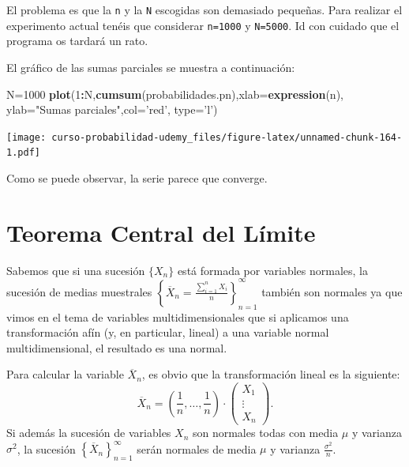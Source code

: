 \documentclass[]{book}
\newenvironment{Shaded}{\begin{snugshade}}{\end{snugshade}}
\newcommand{\DataTypeTok}[1]{\textcolor[rgb]{0.13,0.29,0.53}{#1}}
\newcommand{\DecValTok}[1]{\textcolor[rgb]{0.00,0.00,0.81}{#1}}
\newcommand{\KeywordTok}[1]{\textcolor[rgb]{0.13,0.29,0.53}{\textbf{#1}}}
\newcommand{\NormalTok}[1]{#1}
\newcommand{\OperatorTok}[1]{\textcolor[rgb]{0.81,0.36,0.00}{\textbf{#1}}}
\newcommand{\StringTok}[1]{\textcolor[rgb]{0.31,0.60,0.02}{#1}}
\begin{document}
El problema es que la \texttt{n} y la \texttt{N} escogidas son demasiado pequeñas. Para realizar el experimento actual tenéis que considerar \texttt{n=1000} y \texttt{N=5000}. Id con cuidado que el programa os tardará un rato.

El gráfico de las sumas parciales se muestra a continuación:

\begin{Shaded}
\begin{Highlighting}[]
\NormalTok{N=}\DecValTok{1000}
\KeywordTok{plot}\NormalTok{(}\DecValTok{1}\OperatorTok{:}\NormalTok{N,}\KeywordTok{cumsum}\NormalTok{(probabilidades.pn),}\DataTypeTok{xlab=}\KeywordTok{expression}\NormalTok{(n),}
     \DataTypeTok{ylab=}\StringTok{"Sumas parciales"}\NormalTok{,}\DataTypeTok{col=}\StringTok{'red'}\NormalTok{, }\DataTypeTok{type=}\StringTok{'l'}\NormalTok{)}
\end{Highlighting}
\end{Shaded}

\texttt{[image: curso-probabilidad-udemy\_files/figure-latex/unnamed-chunk-164-1.pdf]}

Como se puede observar, la serie parece que converge.

\hypertarget{teorema-central-del-luxedmite}{%
\section{Teorema Central del Límite}\label{teorema-central-del-luxedmite}}

Sabemos que si una sucesión \(\{X_n\}\) está formada por variables normales, la sucesión de medias muestrales \(\left\{\overline{X}_n=\frac{\sum\limits_{i=1}^n X_i}{n}\right\}_{n=1}^\infty\) también son normales ya que vimos en el tema de variables multidimensionales que si aplicamos una transformación afín (y, en particular, lineal) a una variable normal multidimensional, el resultado es una normal.

Para calcular la variable \(\overline{X}_n\), es obvio que la transformación lineal es la siguiente:
\[
\overline{X}_n = \left(\frac{1}{n},\ldots,\frac{1}{n}\right)\cdot \begin{pmatrix}X_1 \\\vdots\\ X_n\end{pmatrix}.
\]
Si además la sucesión de variables \(X_n\) son normales todas con media \(\mu\) y varianza \(\sigma^2\), la sucesión \(\left\{\overline{X}_n\right\}_{n=1}^\infty\) serán normales de media \(\mu\) y varianza \(\frac{\sigma^2}{n}\).
\end{document}
